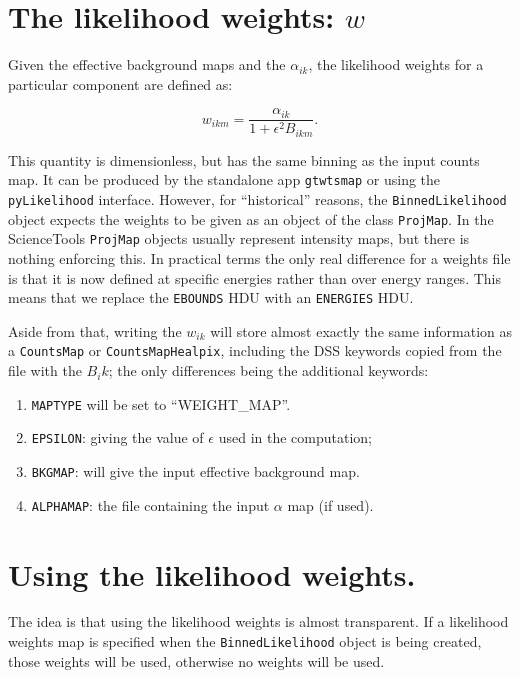 \documentclass[preprint]{aastex}
\begin{document}
\section{The likelihood weights: $w$}

Given the effective background maps and the $\alpha_{ik}$, the
likelihood weights for a particular component are defined as:

\begin{equation}
w_{ikm} = \frac{\alpha_{ik}}{1 + \epsilon^2 B_{ikm}}.
\end{equation}

This quantity is dimensionless, but has the same binning as the input
counts map.  It can be produced by the standalone app {\tt gtwtsmap}
or using the {\tt pyLikelihood} interface.  However, for
``historical'' reasons, the {\tt BinnedLikelihood} object expects the
weights to be given as an object of the class {\tt ProjMap}.  In the
ScienceTools {\tt ProjMap} objects usually represent intensity maps,
but there is nothing enforcing this.  In practical terms the only real
difference for a weights file is that it is now defined at specific
energies rather than over energy ranges.  This means that we replace
the {\tt EBOUNDS} HDU with an {\tt ENERGIES} HDU.

Aside from that, writing the $w_{ik}$ will store almost exactly the
same information as a {\tt CountsMap} or {\tt CountsMapHealpix},
including the DSS keywords copied from the file with the $B_ik$; the
only differences being the additional keywords:

\begin{enumerate}
\item{{\tt MAPTYPE} will be set to ``WEIGHT\_MAP''.}
\item{{\tt EPSILON}: giving the value of $\epsilon$ used in the computation;}
\item{{\tt BKGMAP}: will give the input effective background map.}    
\item{{\tt ALPHAMAP}: the file containing the input $\alpha$ map (if used).}
\end{enumerate}


\section{Using the likelihood weights.}

The idea is that using the likelihood weights is almost transparent.
If a likelihood weights map is specified when the {\tt BinnedLikelihood}
object is being created, those weights will be used, otherwise no
weights will be used.
\end{document}
